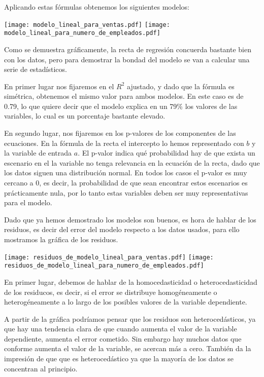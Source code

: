 \documentclass{article}
\begin{document}
Aplicando estas fórmulas obtenemos los siguientes modelos:

\texttt{[image: modelo\_lineal\_para\_ventas.pdf]}
\texttt{[image: modelo\_lineal\_para\_numero\_de\_empleados.pdf]}
\FloatBarrier

Como se demuestra gráficamente, la recta de regresión concuerda bastante bien con los datos, pero para demostrar la bondad del modelo se van a calcular una serie de estadísticos.



\FloatBarrier

En primer lugar nos fijaremos en el $R^2$ ajustado, y dado que la fórmula es simétrica, obtenemos el mismo valor para ambos modelos. En este caso es de 0.79, lo que quiere decir que el modelo explica en un 79\% los valores de las variables, lo cual es un porcentaje bastante elevado.

En segundo lugar, nos fijaremos en los p-valores de los componentes de las ecuaciones. En la fórmula de la recta el intercepto lo hemos representado con $b$ y la variable de entrada $a$. El p-valor indica qué probabilidad hay de que exista un escenario en el la variable no tenga relevancia en la ecuación de la recta, dado que los datos siguen una distribución normal. En todos los casos el p-valor es muy cercano a 0, es decir, la probabilidad de que sean encontrar estos escenarios es prácticamente nula, por lo tanto estas variables deben ser muy representativas para el modelo.

Dado que ya hemos demostrado los modelos son buenos, es hora de hablar de los residuos, es decir del error del modelo respecto a los datos usados, para ello mostramos la gráfica de los residuos.

\texttt{[image: residuos\_de\_modelo\_lineal\_para\_ventas.pdf]}
\texttt{[image: residuos\_de\_modelo\_lineal\_para\_numero\_de\_empleados.pdf]}
\FloatBarrier

En primer lugar, debemos de hablar de la homocedasticidad o heterocedasticidad de los residucos, es decir, si el error se distribuye homogéneamente o heterogéneamente a lo largo de los posibles valores de la variable dependiente.

A partir de la gráfica podríamos pensar que los residuos son heterocedásticos, ya que hay una tendencia clara de que cuando aumenta el valor de la variable dependiente, aumenta el error cometido. Sin embargo hay muchos datos que conforme aumenta el valor de la variable, se acercan más a cero. También da la impresión de que que es heterocedástico ya que la mayoría de los datos se concentran al principio.
\end{document}
